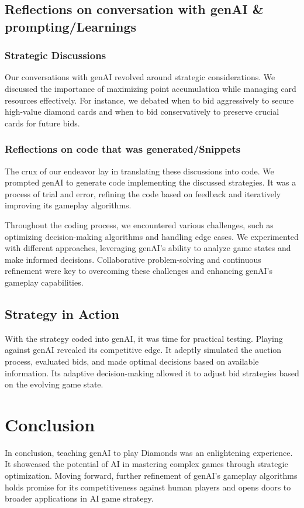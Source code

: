 \documentclass{article}
\begin{document}
\subsection*{Reflections on conversation with genAI \& prompting/Learnings}
\subsubsection*{Strategic Discussions}
Our conversations with genAI revolved around strategic considerations. We discussed the importance of maximizing point accumulation while managing card resources effectively. For instance, we debated when to bid aggressively to secure high-value diamond cards and when to bid conservatively to preserve crucial cards for future bids.

\subsubsection*{Reflections on code that was generated/Snippets}
The crux of our endeavor lay in translating these discussions into code. We prompted genAI to generate code implementing the discussed strategies. It was a process of trial and error, refining the code based on feedback and iteratively improving its gameplay algorithms.

Throughout the coding process, we encountered various challenges, such as optimizing decision-making algorithms and handling edge cases. We experimented with different approaches, leveraging genAI's ability to analyze game states and make informed decisions. Collaborative problem-solving and continuous refinement were key to overcoming these challenges and enhancing genAI's gameplay capabilities.


\subsection*{Strategy in Action}
With the strategy coded into genAI, it was time for practical testing. Playing against genAI revealed its competitive edge. It adeptly simulated the auction process, evaluated bids, and made optimal decisions based on available information. Its adaptive decision-making allowed it to adjust bid strategies based on the evolving game state.

\section*{Conclusion}
In conclusion, teaching genAI to play Diamonds was an enlightening experience. It showcased the potential of AI in mastering complex games through strategic optimization. Moving forward, further refinement of genAI's gameplay algorithms holds promise for its competitiveness against human players and opens doors to broader applications in AI game strategy.
\end{document}
